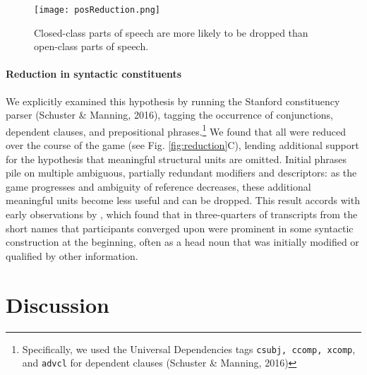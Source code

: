 \begin{figure}[t!]
\centering
\texttt{[image: posReduction.png]}
\caption{Closed-class parts of speech are more likely to be dropped than open-class parts of speech.} %
\label{fig:pos}
\end{figure}

\paragraph{Reduction in syntactic constituents}
We explicitly examined this hypothesis by running the Stanford
constituency parser (Schuster \& Manning, 2016), tagging the occurrence
of conjunctions, dependent clauses, and
prepositional phrases.\footnote{Specifically,
  we used the Universal Dependencies tags \texttt{csubj, ccomp, xcomp},
  and \texttt{advcl} for dependent clauses (Schuster \& Manning, 2016)} 
We found that all were reduced over the course of the game (see Fig.
\ref{fig:reduction}C), lending additional support for the hypothesis
that meaningful structural units are omitted. Initial phrases pile
on multiple ambiguous, partially redundant modifiers and descriptors: as
the game progresses and ambiguity of reference decreases, these
additional meaningful units become less useful and can be dropped.
This result accords with early observations by \cite{Carroll80_NamingHedges}, which found that in three-quarters of transcripts from \cite{KraussWeinheimer64_ReferencePhrases} the short names that participants converged upon were prominent in some syntactic construction at the beginning, often as a head noun that was initially modified or qualified by other information. 

%


\section{Discussion}\label{general-discussion}

